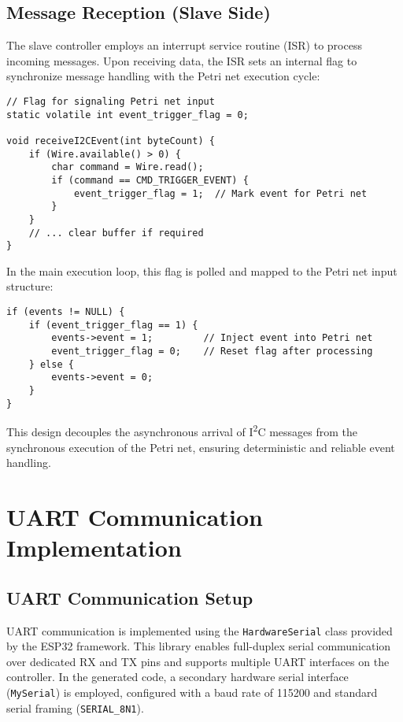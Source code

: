 \subsection{Message Reception (Slave Side)}
The slave controller employs an interrupt service routine (ISR) to process incoming messages. Upon receiving data, the ISR sets an internal flag to synchronize message handling with the Petri net execution cycle:
\begin{verbatim}
// Flag for signaling Petri net input
static volatile int event_trigger_flag = 0;

void receiveI2CEvent(int byteCount) {
    if (Wire.available() > 0) {
        char command = Wire.read();
        if (command == CMD_TRIGGER_EVENT) {
            event_trigger_flag = 1;  // Mark event for Petri net
        }
    }
    // ... clear buffer if required
}
\end{verbatim}
In the main execution loop, this flag is polled and mapped to the Petri net input structure:
\begin{verbatim}
if (events != NULL) {
    if (event_trigger_flag == 1) {
        events->event = 1;         // Inject event into Petri net
        event_trigger_flag = 0;    // Reset flag after processing
    } else {
        events->event = 0;
    }
}
\end{verbatim}
This design decouples the asynchronous arrival of I\textsuperscript{2}C messages from the synchronous execution of the Petri net, ensuring deterministic and reliable event handling.



\section{UART Communication Implementation}
\label{sec:uart_implementation}


\subsection{UART Communication Setup}
UART communication is implemented using the \texttt{HardwareSerial} class provided by the ESP32 framework. This library enables full-duplex serial communication over dedicated RX and TX pins and supports multiple UART interfaces on the controller. In the generated code, a secondary hardware serial interface (\texttt{MySerial}) is employed, configured with a baud rate of 115200 and standard serial framing (\texttt{SERIAL\_8N1}).

